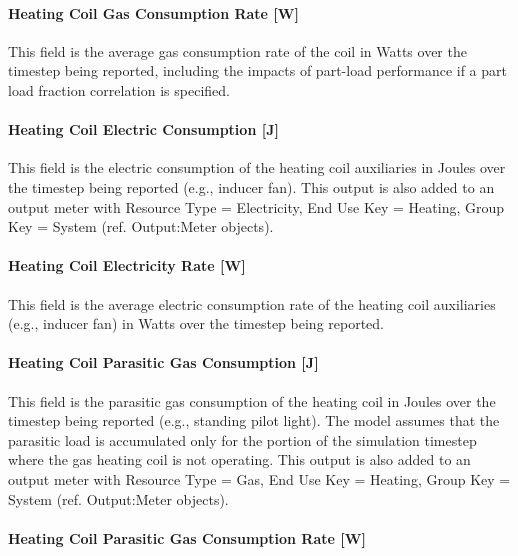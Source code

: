 \paragraph{Heating Coil Gas Consumption Rate {[}W{]}}\label{heating-coil-gas-consumption-rate-w}

This field is the average gas consumption rate of the coil in Watts over the timestep being reported, including the impacts of part-load performance if a part load fraction correlation is specified.

\paragraph{Heating Coil Electric Consumption {[}J{]}}\label{heating-coil-electric-consumption-j-1}

This field is the electric consumption of the heating coil auxiliaries in Joules over the timestep being reported (e.g., inducer fan). This output is also added to an output meter with Resource Type = Electricity, End Use Key = Heating, Group Key = System (ref. Output:Meter objects).

\paragraph{Heating Coil Electricity Rate {[}W{]}}\label{heating-coil-electric-power-w-4}

This field is the average electric consumption rate of the heating coil auxiliaries (e.g., inducer fan) in Watts over the timestep being reported.

\paragraph{Heating Coil Parasitic Gas Consumption {[}J{]}}\label{heating-coil-parasitic-gas-consumption-j}

This field is the parasitic gas consumption of the heating coil in Joules over the timestep being reported (e.g., standing pilot light). The model assumes that the parasitic load is accumulated only for the portion of the simulation timestep where the gas heating coil is not operating. This output is also added to an output meter with Resource Type = Gas, End Use Key = Heating, Group Key = System (ref. Output:Meter objects).

\paragraph{Heating Coil Parasitic Gas Consumption Rate {[}W{]}}\label{heating-coil-parasitic-gas-consumption-rate-w}

